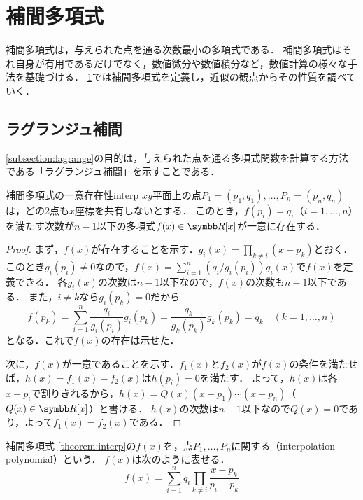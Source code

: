 \documentclass[../../numcalc]{subfiles}
\begin{document}
\chapter{補間多項式}
\label{chapter:interp}
\begin{lead}
補間多項式は，与えられた点を通る次数最小の多項式である．
補間多項式はそれ自身が有用であるだけでなく，数値微分や数値積分など，数値計算の様々な手法を基礎づける．
\cref{chapter:interp}では補間多項式を定義し，近似の観点からその性質を調べていく．
\end{lead}

\section{ラグランジュ補間}
\label{section:lagrange}
\cref{subsection:lagrange}の目的は，与えられた点を通る多項式関数を計算する方法である「ラグランジュ補間」を示すことである．

\label{subsection:lagrange}
\begin{theorem}{補間多項式の一意存在性}{interp}
\(xy\)平面上の点\(P_1=(p_1,q_1),\dots,P_n=(p_n,q_n)\)は，どの2点も\(x\)座標を共有しないとする．
このとき，\(f(p_i)=q_i\)（\(i=1,\dots,n\)）を満たす次数が\(n-1\)以下の多項式\(f(x)\in\polyset{\numset{R}}{x}\)が一意に存在する．
\end{theorem}

\begin{proof}
まず，\(f(x)\)が存在することを示す．\(g_i(x)=\prod_{k\neq i}(x-p_k)\)とおく．
このとき\(g_i(p_i)\neq 0\)なので，\(f(x)=\sum_{i=1}^n(q_i/g_i(p_i))g_i(x)\)で\(f(x)\)を定義できる．
各\(g_i(x)\)の次数は\(n-1\)以下なので，\(f(x)\)の次数も\(n-1\)以下である．
また，\(i\neq k\)なら\(g_i(p_k)=0\)だから
\[
  f(p_k) = \sum_{i=1}^n\frac{q_i}{g_i(p_i)}g_i(p_k)
  = \frac{q_k}{g_k(p_k)}g_k(p_k)
  = q_k\quad(k=1,\dots,n)
\]
となる．これで\(f(x)\)の存在は示せた．

次に，\(f(x)\)が一意であることを示す．\(f_1(x)\)と\(f_2(x)\)が\(f(x)\)の条件を満たせば，\(h(x)=f_1(x)-f_2(x)\)は\(h(p_i)=0\)を満たす．
よって，\(h(x)\)は各\(x-p_i\)で割りきれるから，\(h(x)=Q(x)(x-p_1)\dotsm(x-p_n)\)（\(Q(x)\in\polyset{\numset{R}}{x}\)）と書ける．
\(h(x)\)の次数は\(n-1\)以下なので\(Q(x)=0\)であり，よって\(f_1(x)=f_2(x)\)である．
\end{proof}

\begin{definition}{補間多項式}{}
\cref{theorem:interp}の\(f(x)\)を，点\(P_1,\dots,P_n\)に関する（interpolation polynomial）という．
\(f(x)\)は次のように表せる．
\begin{equation}
  \label{equation:lagrange}
  f(x) = \sum_{i=1}^nq_i\prod_{k\neq i}\frac{x-p_k}{p_i-p_k}  
\end{equation}
\end{definition}
\end{document}
